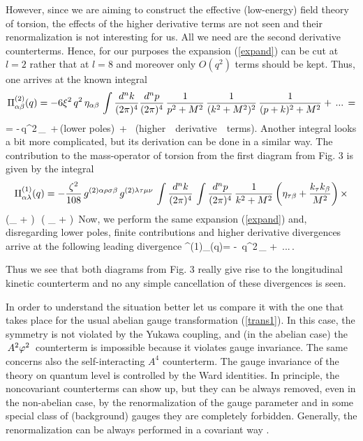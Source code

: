 However, since we are aiming to construct the effective (low-energy)
field theory of torsion, the effects of the higher derivative terms are
not seen and their renormalization is not interesting for us. All we 
need are the second derivative counterterms. Hence, for our purposes
the expansion (\ref{expand}) can be cut at $l=2$ rather that at $l=8$
and moreover only $O(q^2)$ terms should be kept. Thus, one arrives 
at the known integral \cite{hela} 
$$
\Pi^{(2)}_{\alpha\beta}(q) = -6\xi^2\,q^2\,\eta_{\alpha\beta}\,
\int \frac{d^{n} k}{(2\pi)^4}
\frac{d^n p}{(2\pi)^4}\,\frac{1}{p^2+M^2}
\,\frac{1}{(k^2+M^2)^2}\,\frac{1}{(p+k)^2+M^2} + \,...\,=
$$
\beq
= -\,q^2\,\eta_{\al\be} 
\,+\,({\rm lower}\,\,{\rm poles})\, + \, ({\rm higher} \,\, {\rm
derivative} \,\, {\rm terms}).
\eeq
Another integral looks a bit more complicated, but its derivation 
can be done in a similar way.
The contribution to the mass-operator of torsion from the first
diagram from Fig. 3 is given by the integral
$$
\Pi^{(1)}_{\alpha\lambda}(q)=- \frac{\zeta^2}{108}\,
g^{(2)\alpha\rho\sigma\beta}\,g^{(2)\lambda\tau\mu\nu}\,
\int \frac{d^n k}{(2\pi)^4}\,\int \frac{d^n p}{(2\pi)^4}\,
\frac{1}{k^2+M^2}
\left(\eta_{\tau\beta} + \frac{k_\tau k_\beta}{M^2}\right)\times
$$
\beq
\times
\left(\eta_{\rho\mu} +
\right)\,
\,\left( \eta_{\si\nu} +
\right)\,
\label{int3}
\eeq
Now, we perform the same expansion (\ref{expand}) and, disregarding
lower poles, finite contributions and higher derivative 
divergences arrive at the following leading divergence
\beq
\Pi^{(1)}_{\al\la}(q)=
- \,q^2\,\eta_{\al\la} +\, ...\,.
\label{int4}
\eeq

Thus we see that both diagrams from Fig. 3 really give 
rise to the longitudinal kinetic counterterm and no any simple
cancellation of these divergences is seen.

In order to 
understand the situation better let us compare it with the one that
takes place for the usual abelian gauge transformation
(\ref{trans1}). In this case, the symmetry is not violated by the
Yukawa coupling, and (in the abelian case) the $\,A^2\varphi^2\,$
counterterm is impossible because it violates gauge invariance.
The same concerns also the self-interacting $A^4$ counterterm.
The gauge invariance of the theory on quantum level is controlled
by the Ward identities.
In principle, the noncovariant counterterms can show up, but they
can be always removed, even in the non-abelian case,
by the renormalization of the gauge parameter
and in some special class of (background) gauges they are 
completely forbidden. 
Generally, the renormalization can be always performed in a
covariant way \cite{volatyu}.

